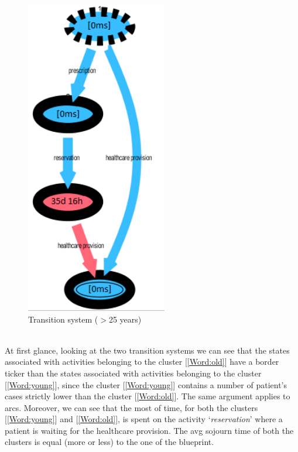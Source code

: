 \begin{figure} [htbp]
\begin{minipage}[t]{0.5\textwidth}
\includegraphics[width=0.55\textwidth]{AmbulatorioSojournOlds}
\caption{Transition system ($>$25 years)}
\end{minipage}
\end{figure}\\
At first glance, looking at the two transition systems we can see that the states associated with activities belonging to the cluster [\ref{Word:old}] have a border ticker than the states associated with activities belonging to the cluster [\ref{Word:young}], since the cluster [\ref{Word:young}] contains a number of patient's cases strictly lower than the cluster [\ref{Word:old}]. The same argument applies to arcs. Moreover, we can see that the most of time, for both the clusters [\ref{Word:young}] and [\ref{Word:old}], is spent on the activity `\textit{reservation}' where a patient is waiting for the healthcare provision. %
The avg sojourn time of both the clusters is equal (more or less) to the one of the blueprint.
\clearpage
\noindent
